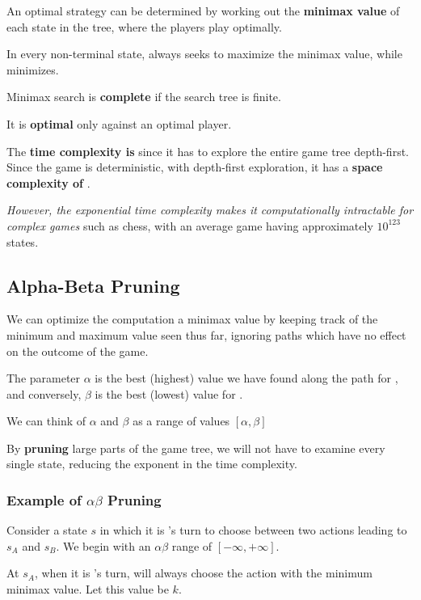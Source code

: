         An optimal strategy can be determined by working out the \textbf{minimax value} of each state in the tree, where the players play optimally.

        In every non-terminal state,  always seeks to maximize the minimax value, while  minimizes.

        Minimax search is \textbf{complete} if the search tree is finite.

        It is \textbf{optimal} only against an optimal player.

        The \textbf{time complexity is}  since it has to explore the entire game tree depth-first. Since the game is deterministic, with depth-first exploration, it has a \textbf{space complexity of} .

        \emph{However, the exponential time complexity makes it computationally intractable for complex games} such as chess, with an average game having approximately $10^{123}$ states.

    \subsection{Alpha-Beta Pruning}
        We can optimize the computation a minimax value by keeping track of the minimum and maximum value seen thus far, ignoring paths which have no effect on the outcome of the game.

        The parameter $\alpha$ is the best (highest) value we have found along the path for , and conversely, $\beta$ is the best (lowest) value for .

        We can think of $\alpha$ and $\beta$ as a range of values $[\alpha, \beta]$

        By \textbf{pruning} large parts of the game tree, we will not have to examine every single state, reducing the exponent in the time complexity.

        \subsubsection{Example of $\alpha$\textendash$\beta$ Pruning}
            Consider a state $s$ in which it is 's turn to choose between two actions leading to $s_A$ and $s_B$. We begin with an $\alpha$\textendash$\beta$ range of $[-\infty, +\infty]$.

            At $s_A$, when it is 's turn,  will always choose the action with the minimum minimax value. Let this value be $k$.


